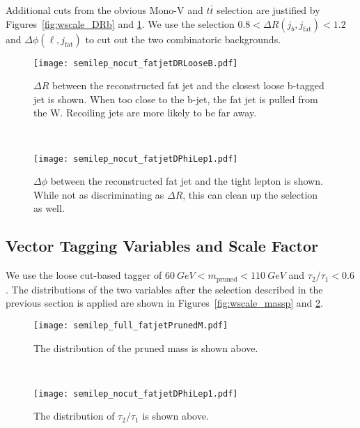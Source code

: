 \documentclass{article}
\begin{document}
Additional cuts from the obvious Mono-V and $t\bar{t}$ selection are 
justified by Figures~\ref{fig:wscale_DRb} and \ref{fig:wscale_DPhiLep}.
We use the selection $0.8 < \Delta R(j_b,j_\text{fat}) < 1.2$ 
and $\Delta\phi(\ell,j_\text{fat})$ to cut out the two combinatoric backgrounds.

\begin{figure}[h]
  \centering
  \begin{minipage}{0.49\linewidth}
    \centering
    \texttt{[image: semilep\_nocut\_fatjetDRLooseB.pdf]}
    \caption{$\Delta R$ between the reconstructed fat jet and the closest loose
    b-tagged jet is shown. When too close to the b-jet, the fat jet is pulled from
    the W. Recoiling jets are more likely to be far away.}
    \label{fig:wscale_DRb}
  \end{minipage}
  ~
  \begin{minipage}{0.49\linewidth}
    \centering
    \texttt{[image: semilep\_nocut\_fatjetDPhiLep1.pdf]}
    \caption{$\Delta\phi$ between the reconstructed fat jet and the tight lepton
      is shown. While not as discriminating as $\Delta R$, this can clean up the selection
      as well.}
    \label{fig:wscale_DPhiLep}
  \end{minipage}
\end{figure}
  
\subsection{Vector Tagging Variables and Scale Factor} \label{sec:wscale_tagging}

We use the loose cut-based tagger of $\SI{60}{GeV} < m_\text{pruned} < \SI{110}{GeV}$
and $\tau_2/\tau_1 < 0.6$.
The distributions of the two variables after the selection described
in the previous section is applied are shown in
Figures~\ref{fig:wscale_massp} and \ref{fig:wscale_tau21}.

\begin{figure}[h]
  \centering
  \begin{minipage}{0.49\linewidth}
    \centering
    \texttt{[image: semilep\_full\_fatjetPrunedM.pdf]}
    \caption{The distribution of the pruned mass is shown above.}
    \label{fig:wscale_massp}
  \end{minipage}
  ~
  \begin{minipage}{0.49\linewidth}
    \centering
    \texttt{[image: semilep\_nocut\_fatjetDPhiLep1.pdf]}
    \caption{The distribution of $\tau_2/\tau_1$ is shown above.}
    \label{fig:wscale_tau21}
  \end{minipage}
\end{figure}
  
\end{document}
